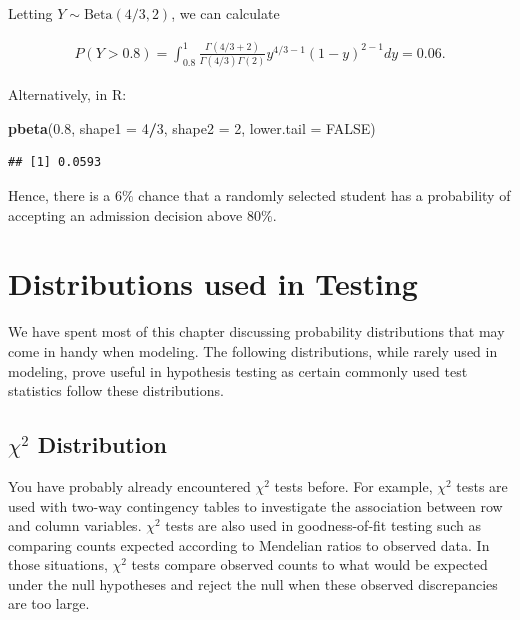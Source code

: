 \documentclass[
]{krantz}
\newenvironment{Shaded}{\begin{snugshade}}{\end{snugshade}}
\newcommand{\DataTypeTok}[1]{\textcolor[rgb]{0.27,0.27,0.27}{#1}}
\newcommand{\DecValTok}[1]{\textcolor[rgb]{0.06,0.06,0.06}{#1}}
\newcommand{\FloatTok}[1]{\textcolor[rgb]{0.06,0.06,0.06}{#1}}
\newcommand{\KeywordTok}[1]{\textcolor[rgb]{0.27,0.27,0.27}{\textbf{#1}}}
\newcommand{\NormalTok}[1]{#1}
\newcommand{\OperatorTok}[1]{\textcolor[rgb]{0.43,0.43,0.43}{\textbf{#1}}}
\newcommand{\OtherTok}[1]{\textcolor[rgb]{0.37,0.37,0.37}{#1}}
\begin{document}
Letting \(Y \sim \textrm{Beta}(4/3,2)\), we can calculate

\begin{align*} 
P(Y > 0.8) = \int_{0.8}^1 \frac{\Gamma(4/3 + 2)}{\Gamma(4/3)\Gamma(2)} y^{4/3-1} (1-y)^{2-1}dy = 0.06.
\end{align*}

Alternatively, in R:

\begin{Shaded}
\begin{Highlighting}[]
\KeywordTok{pbeta}\NormalTok{(}\FloatTok{0.8}\NormalTok{, }\DataTypeTok{shape1 =} \DecValTok{4}\OperatorTok{/}\DecValTok{3}\NormalTok{, }\DataTypeTok{shape2 =} \DecValTok{2}\NormalTok{, }\DataTypeTok{lower.tail =} \OtherTok{FALSE}\NormalTok{)}
\end{Highlighting}
\end{Shaded}

\begin{verbatim}
## [1] 0.0593
\end{verbatim}

Hence, there is a 6\% chance that a randomly selected student has a probability of accepting an admission decision above 80\%.

\hypertarget{distributions-used-in-testing}{%
\section{Distributions used in Testing}\label{distributions-used-in-testing}}

We have spent most of this chapter discussing probability distributions that may come in handy when modeling. The following distributions, while rarely used in modeling, prove useful in hypothesis testing as certain commonly used test statistics follow these distributions.

\hypertarget{chi2-distribution}{%
\subsection{\texorpdfstring{\(\chi^2\) Distribution}{\textbackslash chi\^{}2 Distribution}}\label{chi2-distribution}}

You have probably already encountered \(\chi^2\) tests before. For example, \(\chi^2\) tests are used with two-way contingency tables to investigate the association between row and column variables. \(\chi^2\) tests are also used in goodness-of-fit testing such as comparing counts expected according to Mendelian ratios to observed data. In those situations, \(\chi^2\) tests compare observed counts to what would be expected under the null hypotheses and reject the null when these observed discrepancies are too large.
\end{document}
